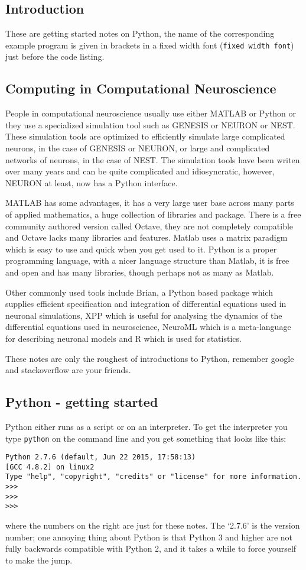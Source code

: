 \documentclass[11pt,a4paper]{scrartcl}
\begin{document}
\subsection*{Introduction}
These are getting started notes on Python, the name of the
corresponding example program is given in brackets in a fixed width
font (\texttt{fixed width font}) just before the code listing.
\subsection*{Computing in Computational Neuroscience}
People in computational neuroscience usually use either MATLAB or
Python or they use a specialized simulation tool such as GENESIS or
NEURON or NEST. These simulation tools are optimized to efficiently
simulate large complicated neurons, in the case of GENESIS or NEURON,
or large and complicated networks of neurons, in the case of NEST. The
simulation tools have been writen over many years and can be quite
complicated and idiosyncratic, however, NEURON at least, now has a
Python interface. 

MATLAB has some advantages, it has a very large user base across many
parts of applied mathematics, a huge collection of libraries and
package. There is a free community authored version called Octave,
they are not completely compatible and Octave lacks many libraries and
features. Matlab uses a matrix paradigm which is easy to use and quick
when you get used to it. Python is a proper programming language, with
a nicer language structure than Matlab, it is free and open and has
many libraries, though perhaps not as many as Matlab.

Other commonly used tools include Brian, a Python based package which
supplies efficient specification and integration of differential
equations used in neuronal simulations, XPP which is useful for
analysing the dynamics of the differential equations used in
neuroscience, NeuroML which is a meta-language for describing neuronal
models and R which is used for statistics.

These notes are only the roughest of introductions to Python, remember
google and stackoverflow are your friends.

\subsection*{Python - getting started}
Python either runs as a script or on an interpreter. To get the
interpreter you type \texttt{python} on the command line and you get
something that looks like this:
\begin{lstlisting}[numbers=right]
Python 2.7.6 (default, Jun 22 2015, 17:58:13) 
[GCC 4.8.2] on linux2
Type "help", "copyright", "credits" or "license" for more information.
>>> 
>>> 
>>> 
\end{lstlisting}
where the numbers on the right are just for these notes. The
\lq{}2.7.6\rq{} is the version number; one annoying thing about Python
is that Python 3 and higher are not fully backwards compatible with
Python 2, and it takes a while to force yourself to make the jump.
\end{document}
